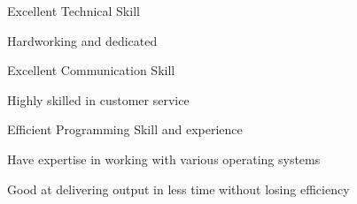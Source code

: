 

\begin{cventries}

  \cvstrength
    {
      \begin{cvitems} %
        \item {Excellent Technical Skill}
        \item {Hardworking and dedicated}
        \item {Excellent Communication Skill}
        \item {Highly skilled in customer service}
        \item {Efficient Programming Skill and experience}
        \item {Have expertise in working with various operating systems}
        \item {Good at delivering output in less time without losing efficiency}
      \end{cvitems}
    }

\end{cventries}
